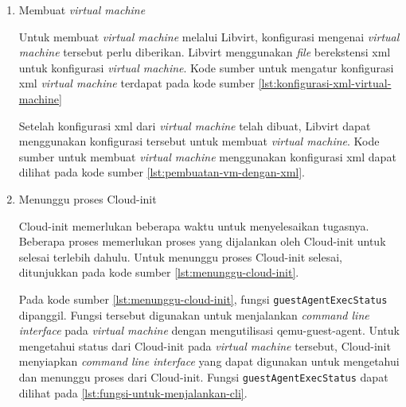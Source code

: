 \begin{enumerate}
    

  \item Membuat \emph{virtual machine}

    Untuk membuat \emph{virtual machine} melalui Libvirt, konfigurasi
    mengenai \emph{virtual machine} tersebut perlu diberikan. Libvirt menggunakan
    \emph{file} berekstensi xml untuk konfigurasi \emph{virtual machine}.
    Kode sumber untuk mengatur konfigurasi xml \emph{virtual machine} terdapat
    pada kode sumber \ref{lst:konfigurasi-xml-virtual-machine}

    

    Setelah konfigurasi xml dari \emph{virtual machine} telah dibuat, Libvirt
    dapat menggunakan konfigurasi tersebut untuk membuat \emph{virtual machine}.
    Kode sumber untuk membuat \emph{virtual machine} menggunakan konfigurasi
    xml dapat dilihat pada kode sumber \ref{lst:pembuatan-vm-dengan-xml}.

    

  \item Menunggu proses Cloud-init

    Cloud-init memerlukan beberapa waktu untuk menyelesaikan tugasnya.
    Beberapa proses memerlukan proses yang dijalankan oleh Cloud-init
    untuk selesai terlebih dahulu. Untuk menunggu proses Cloud-init selesai,
    ditunjukkan pada kode sumber \ref{lst:menunggu-cloud-init}.

    

    Pada kode sumber \ref{lst:menunggu-cloud-init}, fungsi \lstinline{guestAgentExecStatus}
    dipanggil. Fungsi tersebut digunakan untuk menjalankan \emph{command line interface}
    pada \emph{virtual machine} dengan mengutilisasi qemu-guest-agent. Untuk mengetahui
    status dari Cloud-init pada \emph{virtual machine} tersebut, Cloud-init menyiapkan
    \emph{command line interface} yang dapat digunakan untuk mengetahui dan menunggu proses
    dari Cloud-init. Fungsi \lstinline{guestAgentExecStatus} dapat dilihat pada \ref{lst:fungsi-untuk-menjalankan-cli}.

    

\end{enumerate}

